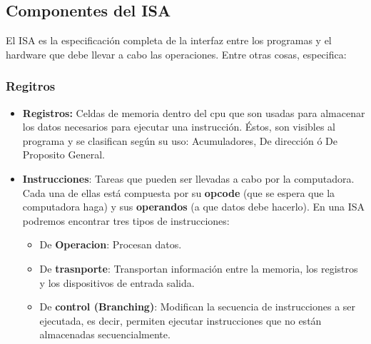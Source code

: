 \subsection{Componentes del ISA}
El ISA es la especificación completa de la interfaz entre los programas y el hardware que debe llevar a cabo las operaciones. Entre otras cosas, especifica:

\subsubsection{Regitros}
\begin{itemize}
	\item \textbf{Registros:} Celdas de memoria dentro del cpu que son usadas para almacenar los datos necesarios para ejecutar una instrucción. Éstos, son visibles al programa y se clasifican según su uso: Acumuladores, De dirección ó De Proposito General.
	\item  \textbf{Instrucciones}: Tareas que pueden ser llevadas a cabo por la computadora. Cada una de ellas está compuesta por su \textbf{opcode} (que se espera que la computadora haga) y sus \textbf{operandos} (a que datos debe hacerlo). En una ISA podremos encontrar tres tipos de instrucciones:
	\begin{itemize}
		\item De \textbf{Operacion}: Procesan datos.
		\item De \textbf{trasnporte}: Transportan información entre la memoria, los registros y los dispositivos de entrada salida.
		\item De \textbf{control (Branching)}: Modifican la secuencia de instrucciones a ser ejecutada, es decir, permiten ejecutar instrucciones que no están almacenadas secuencialmente.
	\end{itemize}
	

\end{itemize}
